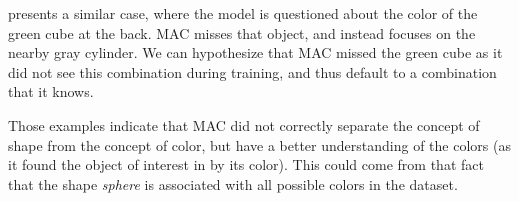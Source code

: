  presents a similar case, where the model is questioned about the color of the green cube at the back. MAC misses that object, and instead focuses on the nearby gray cylinder. We can hypothesize that MAC missed the green cube as it did not see this combination during training, and thus default to a combination that it knows.

Those examples indicate that MAC did not correctly separate the concept of shape from the concept of color, but have a better understanding of the colors (as it found the object of interest in  by its color). This could come from that fact that the shape \textit{sphere} is associated with all possible colors in the dataset. 
